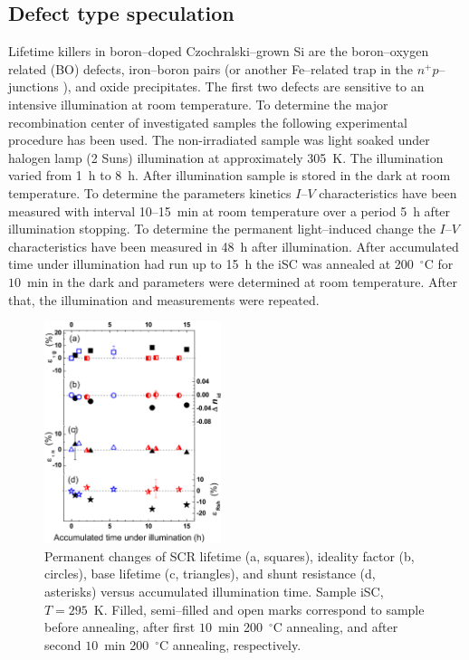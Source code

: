 \documentclass[aip,jap, amsmath,amssymb,reprint]{revtex4-1}
\begin{document}
\subsection{Defect type speculation\label{DefectType}}

Lifetime killers  in boron--doped Czochralski--grown Si are the  boron--oxygen related (BO) defects,\cite{LIDRev,LIDRev2}
iron--boron pairs \cite{MurphyJAP2011,FeB:Vahanissi,FeB:Schmidt} (or another Fe--related trap in the $n^+p$--junctions \cite{TeimurazPSS,TeimurazJAP}),
and oxide precipitates.\cite{MurphySC2014,Oxide_Schon,MurphyJAP2011,MurphyJAP2012,Oxide:Chen,Oxide:Porrini}
The first two defects are sensitive to an intensive illumination at room temperature.
To determine the major recombination center of investigated samples the following experimental procedure has been used.
The non-irradiated sample was light soaked under halogen lamp (2 Suns) illumination at approximately 305~K.
The illumination varied from 1~h to 8~h.
After illumination sample is stored in the dark at room temperature.
To determine the parameters kinetics $I$--$V$ characteristics have been measured with interval 10--15~min at room temperature over a period 5~h after illumination stopping.
To determine the permanent light--induced change the $I$--$V$ characteristics have been measured in 48~h after illumination.
After accumulated time under illumination had run up to 15~h the iSC was annealed at 200~$^\circ$C for $10$~min in the dark and parameters were determined at room temperature.
After that, the illumination and measurements were repeated.


\begin{figure}
\includegraphics[width=0.46\textwidth]{fig_10}%
\caption{\label{fig_Illum}
Permanent changes of SCR lifetime (a, squares), ideality factor (b, circles), base lifetime (c, triangles), and shunt resistance (d, asterisks) versus accumulated illumination time.
Sample iSC, $T=295$~K.
Filled, semi--filled and open marks correspond to sample before annealing, after first $10$~min 200~$^\circ$C annealing, and after second $10$~min 200~$^\circ$C annealing, respectively.
}%
\end{figure}
\end{document}

